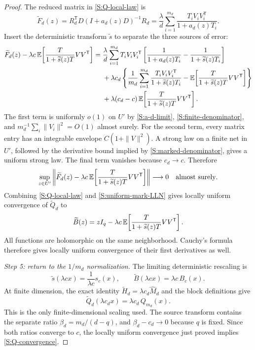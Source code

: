 \begin{proof}
The reduced matrix in \eqref{S:Q-local-law} is
\begin{equation}
\widetilde F_d(z)
=
R_d^{\mathsf T}D(I+a_d(z)D)^{-1}R_d
=
\frac{\lambda}{d}\sum_{i=1}^{m_d}
\frac{T_iV_iV_i^{\mathsf T}}{1+a_d(z)T_i}.
\label{S:empirical-F}
\end{equation}
Insert the deterministic transform $\widetilde s$ to separate the three
sources of error:
\begin{align}
\widetilde F_d(z)
-\lambda c\,\mathbb{E}\!\left[
\frac{T}{1+\widetilde s(z)T}VV^{\mathsf T}
\right]
={}&\frac{\lambda}{d}\sum_{i=1}^{m_d}T_iV_iV_i^{\mathsf T}
\left[
\frac1{1+a_d(z)T_i}
-\frac1{1+\widetilde s(z)T_i}
\right]\notag\\
&+\lambda c_d\left\{
\frac1{m_d}\sum_{i=1}^{m_d}
\frac{T_iV_iV_i^{\mathsf T}}{1+\widetilde s(z)T_i}
-\mathbb{E}\!\left[
\frac{T}{1+\widetilde s(z)T}VV^{\mathsf T}
\right]
\right\}\notag\\
&+\lambda(c_d-c)\,
\mathbb{E}\!\left[
\frac{T}{1+\widetilde s(z)T}VV^{\mathsf T}
\right].
\label{S:marked-LLN-decomposition}
\end{align}
The first term is uniformly $o(1)$ on $U'$ by
\eqref{S:a-d-limit}, \eqref{S:finite-denominator}, and
$m_d^{-1}\sum_i\|V_i\|^2=O(1)$ almost surely.  For the second term, every
matrix entry has an integrable envelope $C(1+\|V\|^2)$.  A strong law on a
finite net in $U'$, followed by the derivative bound implied by
\eqref{S:marked-denominator}, gives a uniform strong law.  The final term
vanishes because $c_d\to c$.  Therefore
\begin{equation}
\sup_{z\in U'}
\left\|
\widetilde F_d(z)
-
\lambda c\,\mathbb{E}\!\left[
\frac{T}{1+\widetilde s(z)T}VV^{\mathsf T}
\right]
\right\|
\longrightarrow0
\quad\text{almost surely}.
\label{S:uniform-mark-LLN}
\end{equation}
Combining \eqref{S:Q-local-law} and \eqref{S:uniform-mark-LLN} gives locally
uniform convergence of $\widetilde Q_d$ to
\begin{equation}
\widetilde B(z)
=
zI_q-
\lambda c\,\mathbb{E}\!\left[
\frac{T}{1+\widetilde s(z)T}VV^{\mathsf T}
\right].
\label{S:B-tilde}
\end{equation}
All functions are holomorphic on the same neighborhood.  Cauchy's formula
therefore gives locally uniform convergence of their first derivatives as
well.

\emph{Step 5: return to the $1/m_d$ normalization.}
The limiting deterministic rescaling is
\begin{equation}
\widetilde s(\lambda cx)=\frac1{\lambda c}s_c(x),
\qquad
\widetilde B(\lambda cx)=\lambda c\,B_c(x).
\label{S:marked-rescaling}
\end{equation}
At finite dimension, the exact identity
$\widetilde H_d=\lambda c_d\widehat M_d$ and the block definitions give
\begin{equation}
\widetilde Q_d(\lambda c_dx)=\lambda c_d\,Q_{m_d}(x).
\label{S:finite-Q-scaling}
\end{equation}
This is the only finite-dimensional scaling used. The source transform
contains the separate ratio $\beta_d=m_d/(d-q)$, and
$\beta_d-c_d\to0$ because $q$ is fixed. Since both ratios converge to $c$,
the locally uniform convergence just proved implies
\eqref{S:Q-convergence}.


\end{proof}
